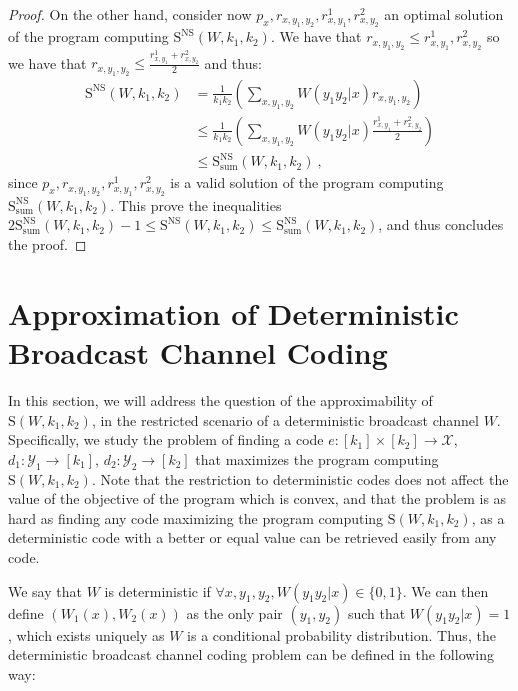 \begin{proof}
  On the other hand, consider now $p_x,r_{x,y_1,y_2},r^1_{x,y_1},r^2_{x,y_2}$ an optimal solution of the program computing $\mathrm{S}^{\mathrm{NS}}(W,k_1,k_2)$. We have that $r_{x,y_1,y_2} \leq r^1_{x,y_1},r^2_{x,y_2}$ so we have that $r_{x,y_1,y_2} \leq \frac{r^1_{x,y_1}+r^2_{x,y_2}}{2}$ and thus:
  \begin{equation}
    \begin{aligned}
      \mathrm{S}^{\mathrm{NS}}(W,k_1,k_2) &= \frac{1}{k_1k_2}\left(\sum_{x,y_1,y_2} W(y_1y_2|x)r_{x,y_1,y_2}\right)\\
      &\leq \frac{1}{k_1k_2}\left(\sum_{x,y_1,y_2} W(y_1y_2|x)\frac{r^1_{x,y_1}+r^2_{x,y_2}}{2}\right)\\
      &\leq \mathrm{S}_{\text{sum}}^{\mathrm{NS}}(W,k_1,k_2) \ ,
    \end{aligned}
  \end{equation}
  since $p_x,r_{x,y_1,y_2},r^1_{x,y_1},r^2_{x,y_2}$ is a valid solution of the program computing $\mathrm{S}^{\mathrm{NS}}_{\text{sum}}(W,k_1,k_2)$. This prove the inequalities $ 2 \mathrm{S}_{\text{sum}}^{\mathrm{NS}}(W,k_1,k_2)-1 \leq  \mathrm{S}^{\mathrm{NS}}(W,k_1,k_2) \leq \mathrm{S}_{\text{sum}}^{\mathrm{NS}}(W,k_1,k_2)$, and thus concludes the proof.
\end{proof}

\section{Approximation of Deterministic Broadcast Channel Coding}
\label{section:ApproxDetBC}
In this section, we will address the question of the approximability of $\mathrm{S}(W,k_1,k_2)$, in the restricted scenario of a deterministic broadcast channel $W$. Specifically, we study the problem of finding a code  $e : [k_1] \times [k_2] \rightarrow \mathcal{X}$, $d_1 : \mathcal{Y}_1 \rightarrow [k_1]$,  $d_2 : \mathcal{Y}_2 \rightarrow [k_2]$ that maximizes the program computing $\mathrm{S}(W,k_1,k_2)$. Note that the restriction to deterministic codes does not affect the value of the objective of the program which is convex, and that the problem is as hard as finding any code maximizing the program computing $\mathrm{S}(W,k_1,k_2)$, as a deterministic code with a better or equal value can be retrieved easily from any code.

We say that $W$ is deterministic if $\forall x,y_1,y_2, W(y_1y_2|x) \in \{0,1\}$. We can then define $(W_1(x),W_2(x))$ as the only pair $(y_1,y_2)$ such that $W(y_1y_2|x)=1$, which exists uniquely as $W$ is a conditional probability distribution. Thus, the deterministic broadcast channel coding problem can be defined in the following way:

